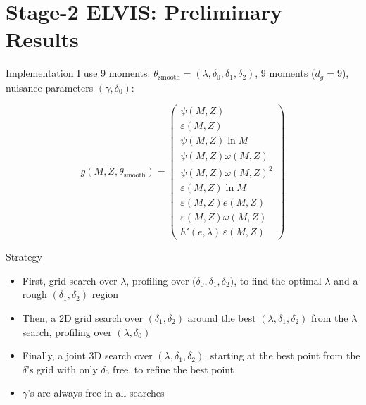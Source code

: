 \documentclass[
  ignorenonframetext,
  aspectratio=169,
]{beamer}
\providecommand{\tightlist}{%
  \setlength{\itemsep}{0pt}\setlength{\parskip}{0pt}}
\begin{document}
\section{Stage-2 ELVIS: Preliminary
Results}\label{stage-2-elvis-preliminary-results}

\begin{frame}{Implementation}
\protect{}\label{sec-elvis-res}
I use 9 moments:
\(\theta_{\text{smooth}}=(\lambda,\delta_0,\delta_1,\delta_2)\), 9
moments (\(d_g=9\)), nuisance parameters \((\gamma,\delta_0)\):

\[
g(M,Z,\theta_{\text{smooth}})=\begin{pmatrix}
\psi(M,Z) \\
\varepsilon(M,Z) \\
\psi(M,Z)\ln M \\
\psi(M,Z)\omega(M,Z) \\
\psi(M,Z)\omega(M,Z)^2 \\
\varepsilon(M,Z)\ln M \\
\varepsilon(M,Z) e(M,Z) \\
\varepsilon(M,Z)\omega(M,Z) \\
h'(e,\lambda)\,\varepsilon(M,Z)
\end{pmatrix}
\]
\end{frame}

\begin{frame}{Strategy}
\protect{}\label{strategy}
\begin{itemize}
\tightlist
\item
  First, grid search over \(\lambda\), profiling over
  (\(\delta_0,\delta_1,\delta_2\)), to find the optimal \(\lambda\) and
  a rough \((\delta_1,\delta_2)\) region
\item
  Then, a 2D grid search over \((\delta_1,\delta_2)\) around the best
  \((\lambda, \delta_1,\delta_2)\) from the \(\lambda\) search,
  profiling over \((\lambda,\delta_0)\)
\item
  Finally, a joint 3D search over \((\lambda,\delta_1,\delta_2)\),
  starting at the best point from the \(\delta\)'s grid with only
  \(\delta_0\) free, to refine the best point
\item
  \(\gamma\)'s are always free in all searches
\end{itemize}
\end{frame}
\end{document}
